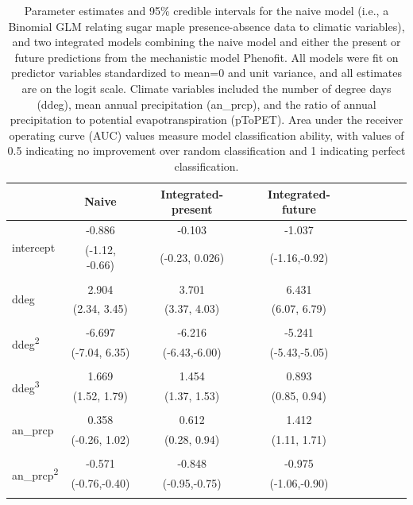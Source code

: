 \documentclass[11pt]{article}
\begin{document}
\begin{table}[t]
	\footnotesize
	\caption{Parameter estimates and 95\% credible intervals for the naive model (i.e., a Binomial GLM relating sugar maple presence-absence data to climatic variables), and two integrated models combining the naive model and either the present or future predictions from the mechanistic model Phenofit. All models were fit on predictor variables standardized to mean=0 and unit variance, and all estimates are on the logit scale. Climate variables included the number of degree days (ddeg), mean annual precipitation (an\_prcp), and the ratio of annual precipitation to potential evapotranspiration (pToPET). Area under the receiver operating curve (AUC) values measure model classification ability, with values of 0.5 indicating no improvement over random classification and 1 indicating perfect classification.}
	\begin{tabular}{lcccccccc}
	\toprule
	& Naive & Integrated-present & Integrated-future \\
	\midrule
	\multirow{2}{*}{intercept} & -0.886 & -0.103 & -1.037 \\
	& (-1.12, -0.66) & (-0.23, 0.026) & (-1.16,-0.92) \\
	& & & \\
	
	\multirow{2}{*}{ddeg} & 2.904 & 3.701 & 6.431 \\
	& (2.34, 3.45) & (3.37, 4.03) & (6.07, 6.79) \\
	& & & \\
	
	\multirow{2}{*}{ddeg\textsuperscript{2}} & -6.697 & -6.216 & -5.241 \\
	& (-7.04, 6.35) & (-6.43,-6.00) & (-5.43,-5.05) \\
	& & & \\
	
	\multirow{2}{*}{ddeg\textsuperscript{3}} & 1.669 & 1.454 & 0.893 \\
	& (1.52, 1.79) & (1.37, 1.53) & (0.85, 0.94) \\
	& & & \\
	
	\multirow{2}{*}{an\_prcp} & 0.358 & 0.612 & 1.412 \\
	& (-0.26, 1.02) & (0.28, 0.94) & (1.11, 1.71) \\
	& & & \\
	
	\multirow{2}{*}{an\_prcp\textsuperscript{2}} & -0.571 & -0.848 & -0.975 \\
	& (-0.76,-0.40) & (-0.95,-0.75) & (-1.06,-0.90) \\
	& & & \\
	

\end{tabular}
\end{table}
\end{document}
